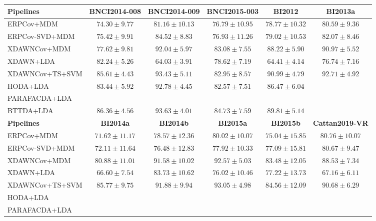 \begin{tabularx}{\textwidth}{@{}Xccccc@{}}
\toprule
\textbf{Pipelines}            & \textbf{BNCI2014-008} & \textbf{BNCI2014-009}
                              & \textbf{BNCI2015-003} & \textbf{BI2012} &
                              \textbf{BI2013a}\\
\midrule
ERPCov+MDM            & $74.30\pm9.77$ & $81.16\pm10.13$ & $76.79\pm10.95$ &
$78.77\pm10.32$ & $80.59\pm9.36$ \\
ERPCov-SVD+MDM  & $75.42\pm9.91$ & $84.52\pm8.83$ & $76.93\pm11.26$ &
$79.02\pm10.53$ & $82.07\pm8.46$ \\
XDAWNCov+MDM          & $77.62\pm9.81$ & $92.04\pm5.97$ & $83.08\pm7.55$ &
$88.22\pm5.90$ & $90.97\pm5.52$ \\
XDAWN+LDA             & $82.24\pm5.26$ & $64.03\pm3.91$ & $78.62\pm7.19$ &
$64.41\pm4.14$ & $76.74\pm7.16$ \\
XDAWNCov+TS+SVM       & $85.61\pm4.43$ & $93.43\pm5.11$ & $82.95\pm8.57$ &
\boldmath$90.99\pm4.79$ & $92.71\pm4.92$\\ \midrule
HODA+LDA                  & $83.44\pm5.92$ & $92.78\pm4.45$ & $82.57\pm7.51$
                          & $86.47\pm6.04$ & \\
PARAFACDA+LDA             & & & & &  \\
BTTDA+LDA                 & \boldmath$86.36\pm4.56$ & \boldmath$93.63\pm4.01$ &
                          \boldmath$84.73\pm7.59$& $89.81\pm5.14$&  \\
\toprule
\textbf{Pipelines} & \textbf{BI2014a} & \textbf{BI2014b} & \textbf{BI2015a} &
\textbf{BI2015b} & \textbf{Cattan2019-VR}\\
\midrule
ERPCov+MDM            & $71.62\pm11.17$ & $78.57\pm12.36$ & $80.02\pm10.07$ &
$75.04\pm15.85$ & $80.76\pm10.07$ \\
ERPCov-SVD+MDM  & $72.11\pm11.64$ & $76.48\pm12.83$ & $77.92\pm10.33$ &
$77.09\pm15.81$ & $80.67\pm9.47$ \\
XDAWNCov+MDM          & $80.88\pm11.01$ & $91.58\pm10.02$ & $92.57\pm5.03$ &
$83.48\pm12.05$ & $88.53\pm7.34$ \\
XDAWN+LDA             & $66.60\pm7.54$ & $83.73\pm10.62$ & $76.02\pm10.46$ &
$77.22\pm13.73$ & $67.16\pm6.11$ \\
XDAWNCov+TS+SVM       & $85.77\pm9.75$ & $91.88\pm9.94$ & $93.05\pm4.98$ &
$84.56\pm12.09$ &$90.68\pm6.29$ \\ \midrule
HODA+LDA                  & & & & &  \\
PARAFACDA+LDA             & & & & &  \\

\end{tabularx}
